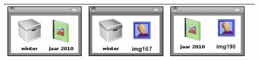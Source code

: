\documentclass[12pt]{article}
\begin{document}
\begin{minipage}{\textwidth}
\begin{table}[H]
\begin{tabulary}{\linewidth}{|C|C|C|C|}
					\includegraphics[width=\linewidth]{option2} &			\includegraphics[width=\linewidth]{option3} &			\includegraphics[width=\linewidth]{option4} \\
					\hline 
				\end{tabulary}
			\end{table}
	\end{minipage} \\ \\
	
\end{document}
